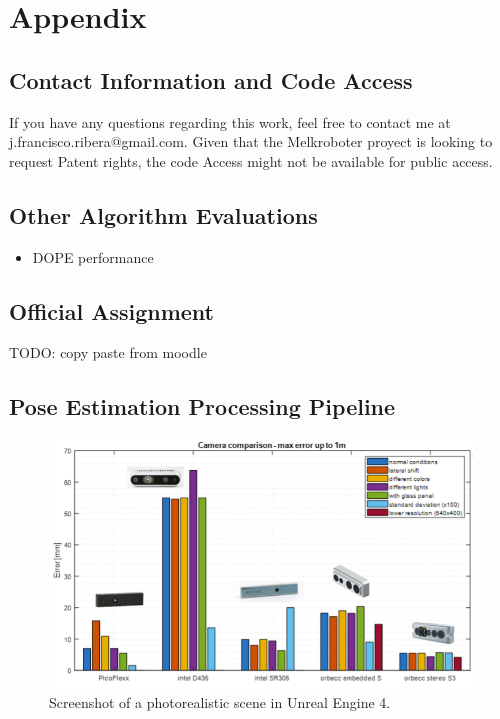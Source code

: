 \chapter{Appendix}\label{sec:chapAppendix}

\section{Contact Information and Code Access}
If you have any questions regarding this work, feel free to contact me at j.francisco.ribera@gmail.com. Given that the Melkroboter proyect is looking to request Patent rights, the code Access might not be available for public access.
\section{Other Algorithm Evaluations}
    \begin{itemize}
        \item DOPE performance
    \end{itemize}
\section{Official Assignment}
TODO: copy paste from moodle

\newpage
\section{Pose Estimation Processing Pipeline}
\label{appendix:ndds}
\begin{figure}[!ht]
    \centering
    \includegraphics[width=1\textwidth]{images/camera_choice.png}
    \caption{Screenshot of a photorealistic scene in Unreal Engine 4.}
    \label{fig:ue4}
\end{figure}

